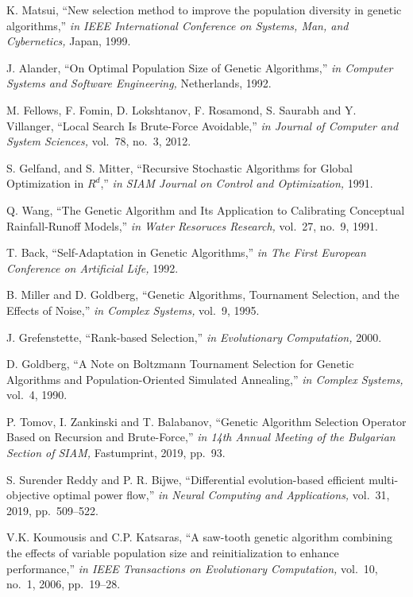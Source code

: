 \documentclass[conference]{IEEEtran}
\begin{document}
\begin{thebibliography}{99}

 K. Matsui, ``New selection method to improve the population diversity in genetic algorithms,'' {\it in IEEE International Conference on Systems, Man, and Cybernetics,} Japan, 1999.

 J. Alander, ``On Optimal Population Size of Genetic Algorithms,'' {\it in Computer Systems and Software Engineering,} Netherlands, 1992.

 M. Fellows, F. Fomin, D. Lokshtanov, F. Rosamond, S. Saurabh and Y. Villanger, ``Local Search Is Brute-Force Avoidable,'' {\it in Journal of Computer and System Sciences,} vol.~78, no.~3, 2012.

 S. Gelfand, and S. Mitter, ``Recursive Stochastic Algorithms for Global Optimization in $R^d$,'' {\it in SIAM Journal on Control and Optimization,} 1991.

 Q. Wang, ``The Genetic Algorithm and Its Application to Calibrating Conceptual Rainfall‐Runoff Models,'' {\it in Water Resoruces Research,} vol.~27, no.~9, 1991.

 T. Back, ``Self-Adaptation in Genetic Algorithms,'' {\it in The First European Conference on Artificial Life,} 1992.

 B. Miller and D. Goldberg, ``Genetic Algorithms, Tournament Selection, and the Effects of Noise,'' {\it in Complex Systems,} vol.~9, 1995.

 J. Grefenstette, ``Rank-based Selection,'' {\it in Evolutionary Computation,} 2000.

 D. Goldberg, ``A Note on Boltzmann Tournament Selection for Genetic Algorithms and Population-Oriented Simulated Annealing,'' {\it in Complex Systems,} vol.~4, 1990.

 P. Tomov, I. Zankinski and T. Balabanov, ``Genetic Algorithm Selection Operator Based on Recursion and Brute-Force,'' {\it in 14th Annual Meeting of the Bulgarian Section of SIAM,} Fastumprint, 2019, pp.~93.

 S. Surender Reddy and P. R. Bijwe, ``Differential evolution-based efficient multi-objective optimal power flow,'' {\it in Neural Computing and Applications,} vol.~31, 2019, pp.~509--522.

 V.K. Koumousis and C.P. Katsaras, ``A saw-tooth genetic algorithm combining the effects of variable population size and reinitialization to enhance performance,'' {\it in IEEE Transactions on Evolutionary Computation,} vol.~10, no.~1, 2006, pp.~19--28.

\end{thebibliography}
\end{document}
